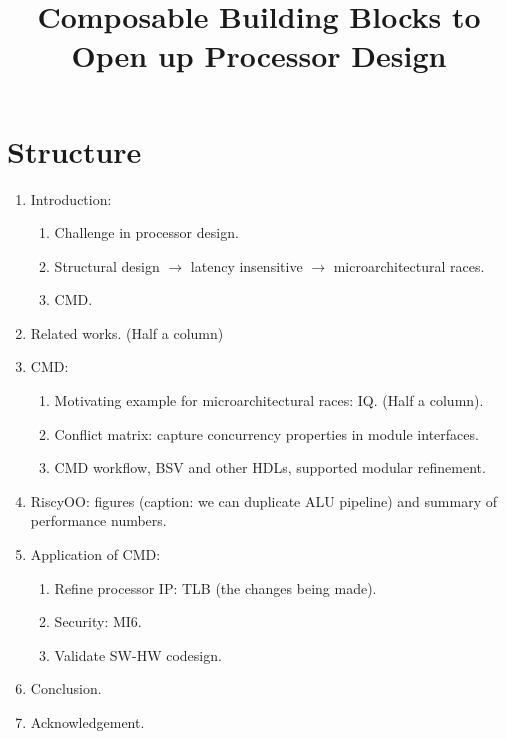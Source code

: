 \documentclass[conference]{IEEEtran}
\begin{document}
\title{Composable Building Blocks to Open up Processor Design}

\author{
}

\maketitle

\section{Structure}
\begin{enumerate}
    \item Introduction:
    \begin{enumerate}
        \item Challenge in processor design.
        \item Structural design $\xrightarrow{}$ latency insensitive  $\xrightarrow{}$ microarchitectural races.
        \item CMD.
    \end{enumerate}
    \item Related works. (Half a column)
    \item CMD:
    \begin{enumerate}
        \item Motivating example for microarchitectural races: IQ. (Half a column).
        \item Conflict matrix: capture concurrency properties in module interfaces.
        \item CMD workflow, BSV and other HDLs, supported modular refinement.
    \end{enumerate}
    \item RiscyOO: figures (caption: we can duplicate ALU pipeline) and summary of performance numbers.
    \item Application of CMD:
    \begin{enumerate}
        \item Refine processor IP: TLB (the changes being made).
        \item Security: MI6.
        \item Validate SW-HW codesign.
    \end{enumerate}
    \item Conclusion.
    \item Acknowledgement.
\end{enumerate}
\end{document}
